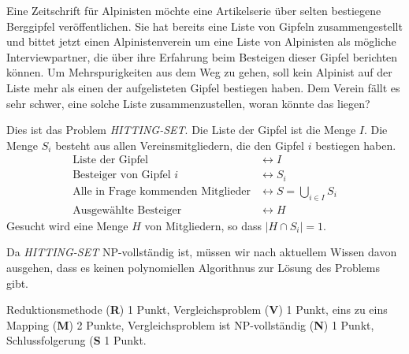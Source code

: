 Eine Zeitschrift für Alpinisten möchte eine Artikelserie über selten bestiegene
Berggipfel veröffentlichen.
Sie hat bereits eine Liste von Gipfeln zusammengestellt
und bittet jetzt einen Alpinistenverein um eine Liste von
Alpinisten als mögliche Interviewpartner, die über ihre Erfahrung
beim Besteigen dieser Gipfel berichten können.
Um Mehrspurigkeiten aus dem Weg zu gehen, soll
kein Alpinist auf der Liste mehr als einen der aufgelisteten Gipfel
bestiegen haben.
Dem Verein fällt es sehr schwer, eine solche Liste zusammenzustellen,
woran könnte das liegen?


\begin{loesung}
Dies ist das Problem {\em HITTING-SET}.
Die Liste der Gipfel ist die Menge $I$.
Die Menge $S_i$ besteht aus allen Vereinsmitgliedern, die den Gipfel
$i$ bestiegen haben.
\begin{align*}
\text{Liste der Gipfel}&\leftrightarrow I
\\
\text{Besteiger von Gipfel $i$}&\leftrightarrow S_i
\\
\text{Alle in Frage kommenden Mitglieder}&\leftrightarrow S = \bigcup_{i\in I}S_i
\\
\text{Ausgewählte Besteiger}&\leftrightarrow H
\end{align*}
Gesucht wird eine Menge $H$ von Mitgliedern, so dass $|H\cap S_i|=1$.

Da {\em HITTING-SET}  NP-vollständig ist, müssen wir nach aktuellem
Wissen davon ausgehen, dass es keinen polynomiellen Algorithnus zur
Lösung des Problems gibt.
\end{loesung}

\begin{bewertung}
Reduktionsmethode ({\bf R}) 1 Punkt,
Vergleichsproblem ({\bf V}) 1 Punkt,
eins zu eins Mapping ({\bf M}) 2 Punkte,
Vergleichsproblem ist NP-vollständig ({\bf N}) 1 Punkt,
Schlussfolgerung ({\bf S} 1 Punkt.
\end{bewertung}

